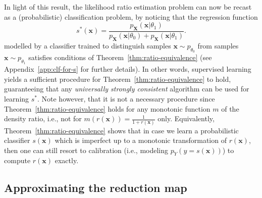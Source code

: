 \documentclass[12pt]{article}
\numberwithin{equation}{section}
\theoremstyle{plain}
\begin{document}

In light of this result, the likelihood ratio estimation problem can now
be recast as a (probabilistic) classification problem, by noticing that the regression
function
\begin{equation}
s^*(\mathbf{x}) = \frac{p_{\mathbf{X}}(\mathbf{x}|\theta_1)}{p_{\mathbf{X}}(\mathbf{x} | \theta_0) + p_{\mathbf{X}}(\mathbf{x} | \theta_1)}.
\end{equation}
modelled by a classifier trained to distinguish samples $\mathbf{x} \sim p_{\theta_0}$
from samples $\mathbf{x} \sim p_{\theta_1}$ satisfies conditions of
Theorem~\ref{thm:ratio-equivalence} (see Appendix~\ref{app:clf-for-s} for further details).
In other words, supervised learning yields a sufficient
procedure for Theorem~\ref{thm:ratio-equivalence} to hold, guaranteeing that any
{\it universally strongly consistent} algorithm can be used for learning $s^*$.
Note however, that it is not a necessary procedure since
Theorem~\ref{thm:ratio-equivalence} holds for any monotonic function $m$ of the
density ratio, i.e., not for $m(r(\mathbf{x})) = \frac{1}{1 +
r(\mathbf{x})}$ only.
Equivalently,
Theorem~\ref{thm:ratio-equivalence} shows that in case we learn a probabilistic
classifier $s(\mathbf{x})$ which is imperfect up to a monotonic transformation
of $r(\mathbf{x})$, then one can still resort to calibration (i.e., modeling
$p_Y(y=s(\mathbf{x}))$) to compute $r(\mathbf{x})$ exactly.



\subsection{Approximating the reduction map}
\end{document}
